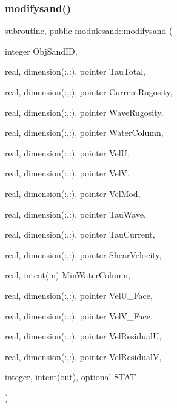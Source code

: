 \subsubsection{\texorpdfstring{modifysand()}{modifysand()}}
{\footnotesize\ttfamily subroutine, public modulesand\+::modifysand (\begin{DoxyParamCaption}\item[{integer}]{Obj\+Sand\+ID,  }\item[{real, dimension(\+:,\+:), pointer}]{Tau\+Total,  }\item[{real, dimension(\+:,\+:), pointer}]{Current\+Rugosity,  }\item[{real, dimension(\+:,\+:), pointer}]{Wave\+Rugosity,  }\item[{real, dimension(\+:,\+:), pointer}]{Water\+Column,  }\item[{real, dimension(\+:,\+:), pointer}]{VelU,  }\item[{real, dimension(\+:,\+:), pointer}]{VelV,  }\item[{real, dimension(\+:,\+:), pointer}]{Vel\+Mod,  }\item[{real, dimension(\+:,\+:), pointer}]{Tau\+Wave,  }\item[{real, dimension(\+:,\+:), pointer}]{Tau\+Current,  }\item[{real, dimension(\+:,\+:), pointer}]{Shear\+Velocity,  }\item[{real, intent(in)}]{Min\+Water\+Column,  }\item[{real, dimension(\+:,\+:), pointer}]{Vel\+U\+\_\+\+Face,  }\item[{real, dimension(\+:,\+:), pointer}]{Vel\+V\+\_\+\+Face,  }\item[{real, dimension(\+:,\+:), pointer}]{Vel\+ResidualU,  }\item[{real, dimension(\+:,\+:), pointer}]{Vel\+ResidualV,  }\item[{integer, intent(out), optional}]{S\+T\+AT }\end{DoxyParamCaption})}

